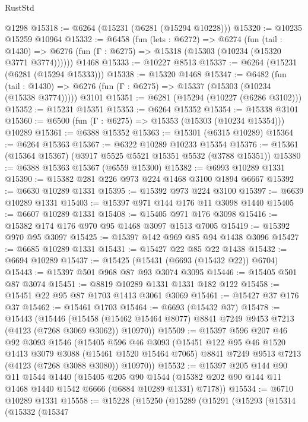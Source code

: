 \begin{lexlean}{RustStd}
\begin{coremodule}
    @1298
@15318 := @6264 (@15231 (@6281 (@15294 @10228)))
@15320 := @10235 @15259 @10964
@15332 := @6458
    (fun (lets : @6272) =>
    @6274
      (fun (tail : @1430) =>
      @6276 (fun (Γ : @6275) => @15318 (@15303 (@10234 (@15320 @3771 @3774))))))
    @1468
@15333 := @10227 @8513
@15337 := @6264 (@15231 (@6281 (@15294 @15333)))
@15338 := @15320 @1468
@15347 := @6482
    (fun (tail : @1430) => @6276 (fun (Γ : @6275) => @15337 (@15303 (@10234 (@15338 @3774)))))
    @3101
@15351 := @6281 (@15294 (@10227 (@6286 @3102)))
@15352 := @15231 @15351
@15353 := @6264 @15352
@15354 := @15338 @3101
@15360 := @6500 (fun (Γ : @6275) => @15353 (@15303 (@10234 @15354))) @10289
@15361 := @6388 @15352
@15363 := @15301 (@6315 @10289)
@15364 := @6264 @15363
@15367 := @6322 @10289 @10233 @15354
@15376 := @15361 (@15364 @15367) (@3917 @5525 @5521 @15351 @5532 (@3788 @15351))
@15380 := @6388 @15363 @15367 (@6559 @15300)
@15382 := @6993 @10289 @1331
@15390 := @15382 @281 @226 @973 @224 @1468 @3100 @1894 @6667
@15392 := @6630 @10289 @1331
@15395 := @15392 @973 @224 @3100
@15397 := @6639 @10289 @1331
@15403 := @15397 @971 @144 @176 @11 @3098 @1440
@15405 := @6607 @10289 @1331
@15408 := @15405 @971 @176 @3098
@15416 := @15382 @174 @176 @970 @95 @1468 @3097 @1513 @7005
@15419 := @15392 @970 @95 @3097
@15425 := @15397 @142 @969 @85 @94 @1438 @3096
@15427 := @6685 @10289 @1331
@15431 := @15427 @22 @85 @22 @1438
@15432 := @6694 @10289
@15437 := @15425 (@15431 (@6693 (@15432 @22)) @6704)
@15443 := @15397 @501 @968 @87 @93 @3074 @3095
@15446 := @15405 @501 @87 @3074
@15451 := @8819 @10289 @1331 @1331 @182 @122
@15458 := @15451 @22 @95 @87 @1703 @1413 @3061 @3069
@15461 := @15427 @37 @176 @37
@15462 := @15461 @1703
@15464 := @6693 (@15432 @37)
@15478 := @15443
    (@15446
      (@15458 (@15462 @15464 @8077) @8841 @7249 @9453 @7213 (@4123 (@7268 @3069 @3062)) @10970))
@15509 := @15397
    @596
    @207
    @46
    @92
    @3093
    @1546
    (@15405
      @596
      @46
      @3093
      (@15451
        @122
        @95
        @46
        @1520
        @1413
        @3079
        @3088
        (@15461 @1520 @15464 @7065)
        @8841
        @7249
        @9513
        @7213
        (@4123 (@7268 @3088 @3080))
        @10970))
@15532 := @15397
    @205
    @144
    @90
    @11
    @1544
    @1440
    (@15405
      @205
      @90
      @1544
      (@15382 @202 @90 @144 @11 @1468 @1440 @1542 @6666 (@6884 @10289 @1331) @7178))
@15534 := @6710 @10289 @1331
@15558 := @15228
    (@15250
      (@15289
        (@15291
          (@15293
            (@15314
              (@15332
                (@15347

\end{coremodule}
\end{lexlean}
